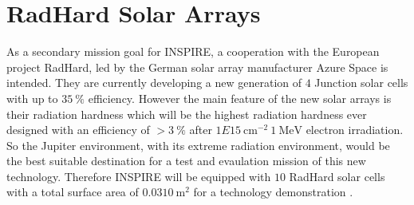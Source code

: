 \section{RadHard Solar Arrays}
\label{subsec:radhard}
As a secondary mission goal for INSPIRE, a cooperation with the European project RadHard, led by the German solar array manufacturer Azure Space is intended. They are currently developing a new generation of $4$ Junction solar cells with up to $35~\% $ efficiency. However the main feature of the new solar arrays is their radiation hardness which will be the highest radiation hardness ever designed with an efficiency of $>3~\% $ after $1E15~\text{cm}^{-2} \ 1~\text{MeV}$ electron irradiation. So the Jupiter environment, with its extreme radiation environment, would be the best suitable destination for a test and evaulation mission of this new technology. Therefore INSPIRE will be equipped with $10$ RadHard solar cells with a total surface area of $0.0310~\text{m}^2$ for a technology demonstration \cite{FraunhoferInstituteforSolarEnergySystemsISE.2021}.


